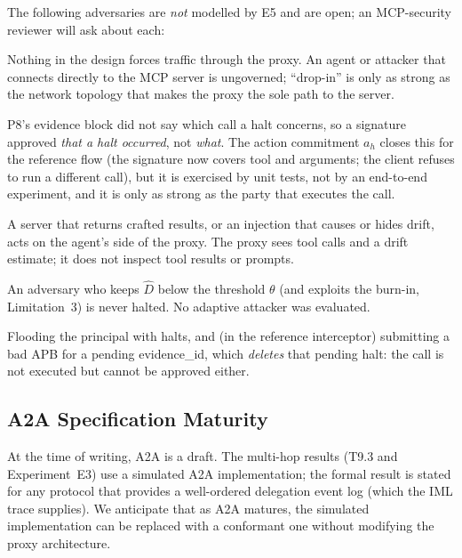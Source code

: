 \documentclass[11pt]{article}
\newcommand{\Dhat}{\widehat{D}}
\newcommand{\ahash}{a_h}   %
\begin{document}
The following adversaries are \emph{not} modelled by E5 and are
open; an MCP-security reviewer will ask about each:
\begin{description}[leftmargin=2em, topsep=2pt]
  \item[M3. Proxy bypass.]
        Nothing in the design forces traffic through the proxy. An agent
        or attacker that connects directly to the MCP server is
        ungoverned; ``drop-in'' is only as strong as the network
        topology that makes the proxy the sole path to the server.
  \item[M4. Time-of-check/time-of-use on the approved call.]
        P8's evidence block did not say which call a halt concerns, so a
        signature approved \emph{that a halt occurred}, not \emph{what}.
        The action commitment $\ahash$ closes this for the reference
        flow (the signature now covers tool and arguments; the client
        refuses to run a different call), but it is exercised by unit
        tests, not by an end-to-end experiment, and it is only as strong as
        the party that executes the call.
  \item[M5. Malicious or poisoned tool server, prompt injection.]
        A server that returns crafted results, or an injection that
        causes or hides drift, acts on the agent's side of the proxy.
        The proxy sees tool calls and a drift estimate; it does not
        inspect tool results or prompts.
  \item[M6. Adaptive evasion of the detector.]
        An adversary who keeps $\Dhat$ below the threshold $\theta$ (and
        exploits the burn-in, Limitation~3) is never halted. No
        adaptive attacker was evaluated.
  \item[M7. Denial of service.]
        Flooding the principal with halts, and (in the reference
        interceptor) submitting a bad APB for a pending evidence\_id,
        which \emph{deletes} that pending halt: the call is not executed
        but cannot be approved either.
\end{description}

\subsection{A2A Specification Maturity}

At the time of writing, A2A \citep{google2025a2a} is a draft. The
multi-hop results (T9.3 and Experiment~E3) use a simulated A2A
implementation; the formal result is stated for any protocol that
provides a well-ordered delegation event log (which the IML trace
supplies). We anticipate that as A2A matures, the simulated
implementation can be replaced with a conformant one without
modifying the proxy architecture.
\end{document}
